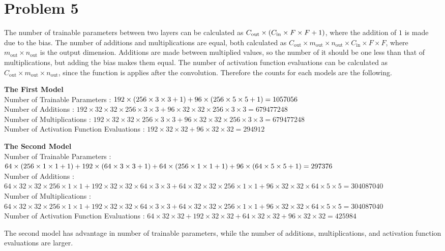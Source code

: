 \documentclass[10pt]{article}
\begin{document}
\section*{Problem 5}
The number of trainable parameters between two layers can be calculated as $C_{\mathrm{out}} \times \qty(C_{\mathrm{in}} \times F \times F + 1)$, where the addition of $1$ is made due to the bias.
The number of additions and multiplications are equal, both calculated as $C_{\mathrm{out}} \times m_{\mathrm{out}} \times n_{\mathrm{out}} \times C_{\mathrm{in}} \times F \times F$, where $m_{\mathrm{out}} \times n_{\mathrm{out}}$ is the output dimension.
Additions are made between multiplied values, so the number of it should be one less than that of multiplications, but adding the bias makes them equal.
The number of activation function evaluations can be calculated as $C_{\mathrm{out}} \times m_{\mathrm{out}} \times n_{\mathrm{out}}$, since the function is applies after the convolution.
Therefore the counts for each models are the following.

\vspace{3mm}
\textbf{The First Model} \\
Number of Trainable Parameters : $192 \times \qty(256 \times 3 \times 3 + 1) + 96 \times \qty(256 \times 5 \times 5 + 1) = 1057056$ \\
Number of Additions : $192 \times 32 \times 32 \times 256 \times 3 \times 3 + 96 \times 32 \times 32 \times 256 \times 3 \times 3 = 679477248$ \\
Number of Multiplications : $192 \times 32 \times 32 \times 256 \times 3 \times 3 + 96 \times 32 \times 32 \times 256 \times 3 \times 3 = 679477248$ \\
Number of Activation Function Evaluations : $192 \times 32 \times 32 + 96 \times 32 \times 32 = 294912$

\vspace{3mm}
\textbf{The Second Model} \\
Number of Trainable Parameters : $64 \times \qty(256 \times 1 \times 1 + 1) + 192 \times \qty(64 \times 3 \times 3 + 1) + 64 \times \qty(256 \times 1 \times 1 + 1) + 96 \times \qty(64 \times 5 \times 5 + 1) = 297376$ \\
Number of Additions : $64 \times 32 \times 32 \times 256 \times 1 \times 1 + 192 \times 32 \times 32 \times 64 \times 3 \times 3 + 64 \times 32 \times 32 \times 256 \times 1 \times 1 + 96 \times 32 \times 32 \times 64 \times 5 \times 5 = 304087040$ \\
Number of Multiplications : $64 \times 32 \times 32 \times 256 \times 1 \times 1 + 192 \times 32 \times 32 \times 64 \times 3 \times 3 + 64 \times 32 \times 32 \times 256 \times 1 \times 1 + 96 \times 32 \times 32 \times 64 \times 5 \times 5 = 304087040$ \\
Number of Activation Function Evaluations : $64 \times 32 \times 32 + 192 \times 32 \times 32 + 64 \times 32 \times 32 + 96 \times 32 \times 32 = 425984$

\vspace{3mm}
The second model has advantage in number of trainable parameters, while the number of additions, multiplications, and activation function evaluations are larger.
\end{document}
